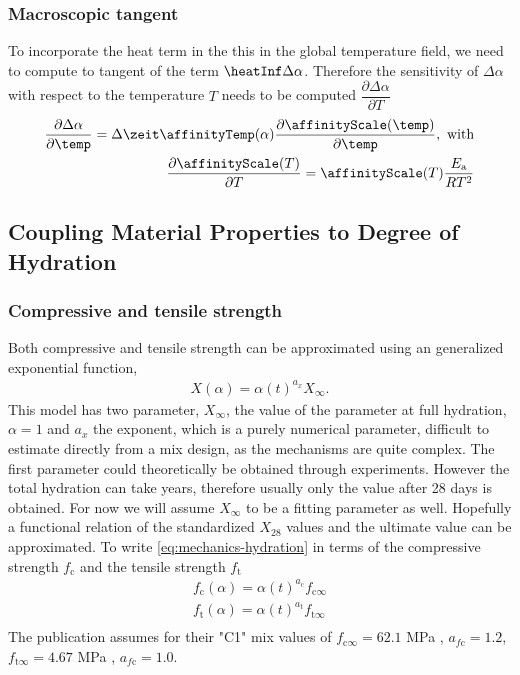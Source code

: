 \subsubsection{Macroscopic tangent}
To incorporate the heat term in the this in the global temperature field, we need to compute to tangent of the term $\heatInf\Delta\alpha$.
Therefore the sensitivity of $\Delta\alpha$ with respect to the temperature $T$ needs to be computed $\dfrac{\partial \Delta\alpha}{\partial T}$
\begin{align}
	\dfrac{\partial \Delta\alpha}{\partial \temp} = \Delta \zeit \affinityTemp(\alpha)\dfrac{\partial \affinityScale(\temp)}{\partial \temp},\text{ with}\\
	\dfrac{\partial \affinityScale(T)}{\partial T} = \affinityScale(T) \frac{E_{\text{a}}}{RT^2}
\end{align}

\subsection{Coupling Material Properties to Degree of Hydration}
\subsubsection{Compressive and tensile strength}
Both compressive and tensile strength can be approximated using an generalized exponential function,
\begin{align}
	X(\alpha) = \alpha(t)^{a_x} X_\infty. \label{eq:mechanics-hydration}
\end{align}
This model has two parameter, $X_\infty$, the value of the parameter at full hydration, $\alpha = 1$ and $a_x$ the exponent, which is a purely numerical parameter, difficult to estimate directly from a mix design, as the mechanisms are quite complex.
The first parameter could theoretically be obtained through experiments.
However the total hydration can take years, therefore usually only the value after 28 days is obtained.
For now we will assume $X_\infty$ to be a fitting parameter as well.
Hopefully a functional relation of the standardized $X_28$ values and the ultimate value can be approximated.
To write \eqref{eq:mechanics-hydration} in terms of the compressive strength $f_{\text{c}}$ and the tensile strength $f_{\text{t}}$
\begin{align}
	f_{\text{c}}(\alpha) = \alpha(t)^{a_{\text{c}}} f_{\text{c}\infty}\\
	f_{\text{t}}(\alpha) = \alpha(t)^{a_{\text{t}}} f_{\text{t}\infty}\\
\end{align}
The publication assumes for their "C1" mix values of  $f_{\text{c}\infty} = 62.1$ MPa , $a_{f\text{c}} = 1.2$,$f_{\text{t}\infty} = 4.67$ MPa , $a_{f\text{c}} = 1.0$.

